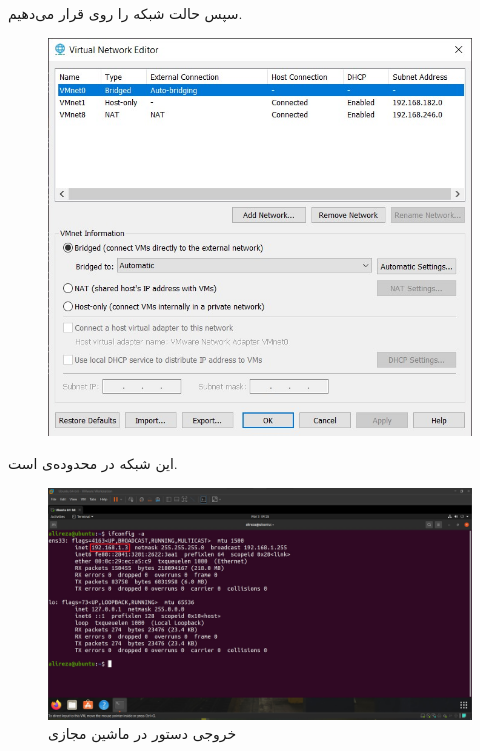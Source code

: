 \documentclass{article}
\begin{document}
سپس حالت شبکه را روی  قرار می‌دهیم.
\begin{figure}[H]
    \centering
    \includegraphics[width=1.0\textwidth]{figures/2b1.jpg}
    \caption
	{
	}
    \label{fig:fig1}
\end{figure}
این شبکه در محدوده‌ی  است.
\begin{figure}[H]
    \centering
    \includegraphics[width=1.0\textwidth]{figures/2c.jpg}
    \caption
	{
خروجی دستور  در ماشین مجازی
	}
    \label{fig:fig1}
\end{figure}
\end{document}
